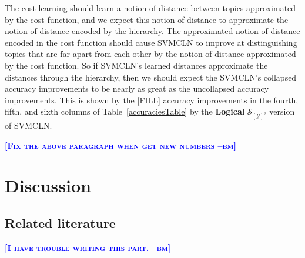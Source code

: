 \documentclass{article} %
\newcommand{\bmcomment}[1]{\textcolor{blue}{\textsc{\textbf{[#1 --bm]}}}}
\begin{document}
The cost learning should learn a notion of distance between topics 
approximated by the cost function, and we expect this notion of distance
to approximate the notion of distance encoded by the hierarchy.  The 
approximated notion of distance encoded in the cost function should 
cause SVMCLN to improve at distinguishing topics that are far apart
from each other by the notion of distance approximated by the cost 
function.  So if SVMCLN's learned distances approximate the distances
through the hierarchy, then we should expect the SVMCLN's collapsed 
accuracy improvements to be nearly as great as the uncollapsed accuracy
improvements.  This is shown by the [FILL] accuracy improvements in the
fourth, fifth, and sixth columns of Table~\ref{accuraciesTable} by
the \textbf{Logical} $\mathcal{S}_{[\mathcal{Y}]^2}$ version of SVMCLN.

\bmcomment{Fix the above paragraph when get new numbers}


%
%
% 
% 


\section{Discussion}

\subsection{Related literature}

\bmcomment{I have trouble writing this part.}
\end{document}
